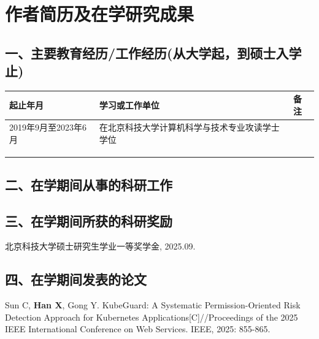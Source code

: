 
\chapter*{作者简历及在学研究成果}

\section*{一、主要教育经历/工作经历(从大学起，到硕士入学止)}


\noindent\renewcommand{\arraystretch}{0.9}
\noindent\begin{tabularx}{\textwidth}{|>{\centering\arraybackslash}X|>{\centering\arraybackslash}X|>{\centering\arraybackslash}X|}
  \hline
  起止年月 & 学习或工作单位 & 备注 \\\hline 
  2019年9月至2023年6月  & 在北京科技大学计算机科学与技术专业攻读学士学位  &    \\\hline
    &  &    \\\hline
    &   &    \\\hline
  & & \\ \hline
\end{tabularx}

\section*{二、在学期间从事的科研工作}



\section*{三、在学期间所获的科研奖励}

\begin{enumerate}[label={[\arabic*]}, itemindent=*,leftmargin=*]

\item 北京科技大学硕士研究生学业一等奖学金, 2025.09.

\end{enumerate}

\section*{四、在学期间发表的论文}

\begin{enumerate}[label={[\arabic*]}, ,itemindent=*,leftmargin=*] 

\item Sun C, \textbf{Han X}, Gong Y. KubeGuard: A Systematic Permission-Oriented Risk Detection Approach for Kubernetes Applications[C]//Proceedings of the 2025 IEEE International Conference on Web Services. IEEE, 2025: 855-865.

\end{enumerate}

